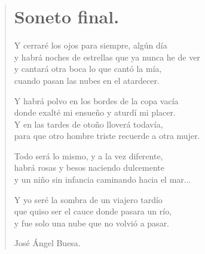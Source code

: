 \documentclass[11pt, portrait, twoside, notitlepage, openright]{book}
\begin{document}
\newpage
\begin{verse}
\begin{center}
\section{Soneto final.}
\end{center}
Y cerraré los ojos para siempre, algún día\\
y habrá noches de estrellas que ya nunca he de ver\\
y cantará otra boca lo que cantó la mía,\\
cuando pasan las nubes en el atardecer.
\newline

Y habrá polvo en los bordes de la copa vacía\\
donde exalté mi ensueño y aturdí mi placer.\\
Y en las tardes de otoño lloverá todavía,\\
para que otro hombre triste recuerde a otra mujer.
\newline

Todo será lo mismo, y a la vez diferente,\\
habrá rosas y besos naciendo dulcemente\\
y un niño sin infancia caminando hacia el mar...
\newline

Y yo seré la sombra de un viajero tardío\\
que quiso ser el cauce donde pasara un río,\\
y fue solo una nube que no volvió a pasar.
\newline

José Ángel Buesa.
\end{verse}
\end{document}
